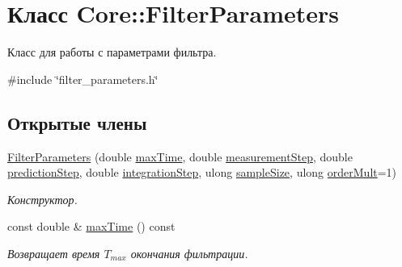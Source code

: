 \hypertarget{class_core_1_1_filter_parameters}{}\section{Класс Core\+:\+:Filter\+Parameters}
\label{class_core_1_1_filter_parameters}


Класс для работы с параметрами фильтра.  




{\ttfamily \#include \char`\"{}filter\+\_\+parameters.\+h\char`\"{}}

\subsection*{Открытые члены}
\begin{DoxyCompactItemize}
\item 
\hyperlink{class_core_1_1_filter_parameters_aac0d147953f2293a426cd25e031016f2}{Filter\+Parameters} (double \hyperlink{class_core_1_1_filter_parameters_a6062feeacb3cd85306e13b90da8fee9b}{max\+Time}, double \hyperlink{class_core_1_1_filter_parameters_a1e868b7a370df88dbd65c1ffe22e1f32}{measurement\+Step}, double \hyperlink{class_core_1_1_filter_parameters_a944d97bb305c33fd713c47948030976b}{prediction\+Step}, double \hyperlink{class_core_1_1_filter_parameters_afec430374fa0ee07f6960a6b42fb85d0}{integration\+Step}, ulong \hyperlink{class_core_1_1_filter_parameters_a93198cf1f29d223fb645be16e91a52fe}{sample\+Size}, ulong \hyperlink{class_core_1_1_filter_parameters_a391dbabccc9b3ab8134789eaac8c15c4}{order\+Mult}=1)
\begin{DoxyCompactList}\small\item\em Конструктор. \end{DoxyCompactList}\item 
\hypertarget{class_core_1_1_filter_parameters_a6062feeacb3cd85306e13b90da8fee9b}{}\label{class_core_1_1_filter_parameters_a6062feeacb3cd85306e13b90da8fee9b} 
const double \& \hyperlink{class_core_1_1_filter_parameters_a6062feeacb3cd85306e13b90da8fee9b}{max\+Time} () const
\begin{DoxyCompactList}\small\item\em Возвращает время $T_{max}$ окончания фильтрации. \end{DoxyCompactList}\item 
\hypertarget{class_core_1_1_filter_parameters_a1e868b7a370df88dbd65c1ffe22e1f32}{}\label{class_core_1_1_filter_parameters_a1e868b7a370df88dbd65c1ffe22e1f32} 

\end{DoxyCompactItemize}
